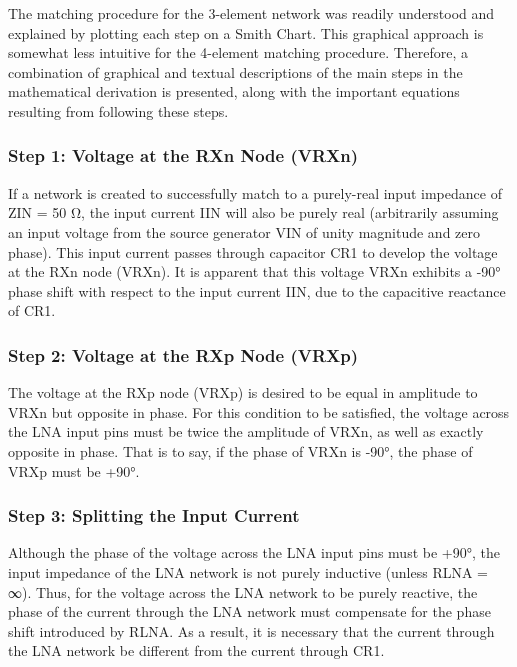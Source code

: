         The matching procedure for the 3-element network was readily understood and explained by plotting 
        each step on a Smith Chart. This graphical approach is somewhat less intuitive for the 4-element 
        matching procedure. Therefore, a combination of graphical and textual descriptions of the main steps 
        in the mathematical derivation is presented, along with the important equations resulting from 
        following these steps.
       
      \subsubsection{Step 1: Voltage at the RXn Node (VRXn)}
        If a network is created to successfully match to a purely-real input impedance of ZIN = 50 Ω, the 
        input current IIN will also be purely real (arbitrarily assuming an input voltage from the source 
        generator VIN of unity magnitude and zero phase). This input current passes through capacitor CR1 to 
        develop the voltage at the RXn node (VRXn). It is apparent that this voltage VRXn exhibits a -90° 
        phase shift with respect to the input current IIN, due to the capacitive reactance of CR1.
        
      \subsubsection{Step 2: Voltage at the RXp Node (VRXp)}
        The voltage at the RXp node (VRXp) is desired to be equal in amplitude to VRXn but opposite in phase. 
        For this condition to be satisfied, the voltage across the LNA input pins must be twice the amplitude 
        of VRXn, as well as exactly opposite in phase. That is to say, if the phase of VRXn is -90°, the 
        phase of VRXp must be +90°.
        
      \subsubsection{Step 3: Splitting the Input Current}
        Although the phase of the voltage across the LNA input pins must be +90°, the input impedance of the 
        LNA network is not purely inductive (unless RLNA = ∞). Thus, for the voltage across the LNA network 
        to be purely reactive, the phase of the current through the LNA network must compensate for the phase 
        shift introduced by RLNA. As a result, it is necessary that the current through the LNA network be 
        different from the current through CR1.
        
